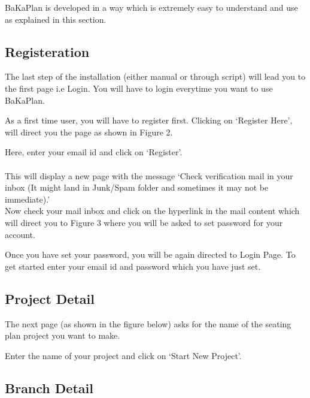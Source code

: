 
BaKaPlan is developed in a way which is extremely easy to
understand and use as explained in this section.

\subsection {Registeration}
The last step of the installation (either manual or through script) will
lead you to the first page i.e Login. You will have to login everytime
 you want to use BaKaPlan.
\\

As a first time user, you will have to register first. Clicking on 
\lq Register Here\rq, will direct you the page as shown in Figure 2.


Here, enter your email id and click on \lq Register\rq.\\\\
This will display a new page with the message \lq Check verification mail
in your inbox (It might land in Junk/Spam folder and sometimes it may 
not be immediate).\rq\\
Now check your mail inbox and click on the hyperlink in the mail content 
which will direct you to Figure 3 where you will be asked to set password
 for your account.


Once you have set your password, you will be again directed to Login Page.
 To get started enter your email id and password which you have just set. 

\subsection{Project Detail}
The next page (as shown in the figure below) asks for the name of the 
seating plan project you want to make.
 

Enter the name of your project and click on \lq Start New Project\rq.

\subsection{Branch Detail}


